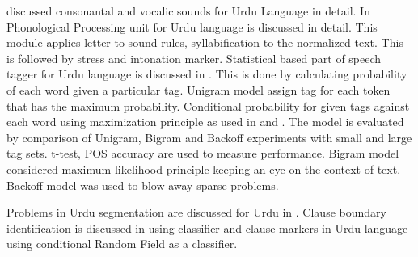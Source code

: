 \cite{saleem2002urdu} discussed consonantal and vocalic sounds for Urdu Language in detail. In \cite{hussain2005phonological}Phonological Processing unit for Urdu language is discussed in detail. This module applies letter to sound rules, syllabification to the normalized text. This is followed by stress and intonation
marker. Statistical based part of speech tagger for Urdu language is discussed in \cite{anwar2007statistical}. This is done by calculating probability of each word given a particular tag. Unigram model assign tag for each token that has the maximum probability. Conditional probability for given tags against each word using maximization principle as used in \cite{bird2007introduction} and \cite{carlberger1999implementing}. The model is evaluated by comparison of Unigram, Bigram and Backoff experiments with small and large tag sets. t-test, POS accuracy are used to measure performance. Bigram model considered maximum likelihood principle keeping an
eye on the context of text. Backoff model was used to blow away sparse problems. 




Problems in Urdu segmentation are discussed for Urdu in \cite{durrani2010urdu}. Clause boundary identification is discussed in 
\cite{parveen2011clause} using classifier
and clause markers in Urdu language using conditional Random Field as a classifier.


